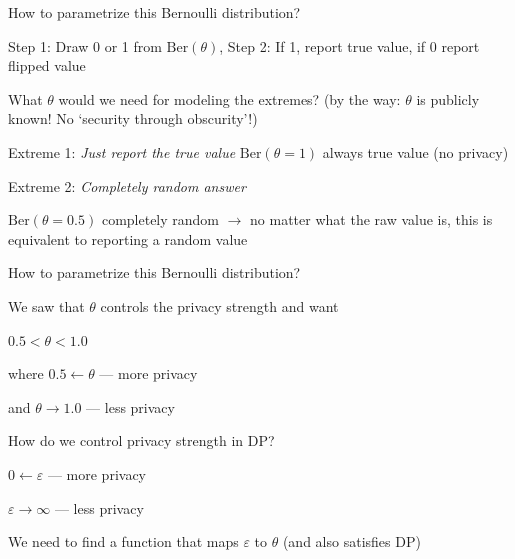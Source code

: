 \documentclass[12pt,aspectratio=169,handout]{beamer}
\begin{document}
\begin{frame}{How to parametrize this Bernoulli distribution?}

Step 1: Draw 0 or 1 from $\mathrm{Ber}(\theta)$, Step 2: If 1, report true value, if 0 report flipped value

What $\theta$ would we need for modeling the extremes? (by the way: $\theta$ is publicly known! No `security through obscurity'!)

\begin{block}{Extreme 1: \emph{Just report the true value}}
\pause
$\mathrm{Ber}(\theta = 1)$ always true value (no privacy)
\end{block}

\begin{block}{Extreme 2: \emph{Completely random answer}}
\pause

$\mathrm{Ber}(\theta = 0.5)$ completely random $\rightarrow$ no matter what the raw value is, this is equivalent to reporting a random value
\end{block}



\end{frame}

\begin{frame}{How to parametrize this Bernoulli distribution?}

We saw that $\theta$ controls the privacy strength and want

$0.5 < \theta < 1.0$

where $0.5 \leftarrow \theta$ --- more privacy

and $\theta \rightarrow 1.0$ --- less privacy


How do we control privacy strength in DP?

$0 \leftarrow \varepsilon$ --- more privacy

$\varepsilon \rightarrow \infty$ --- less privacy

We need to find a function that maps $\varepsilon$ to $\theta$ (and also satisfies DP)
\end{frame}
\end{document}
